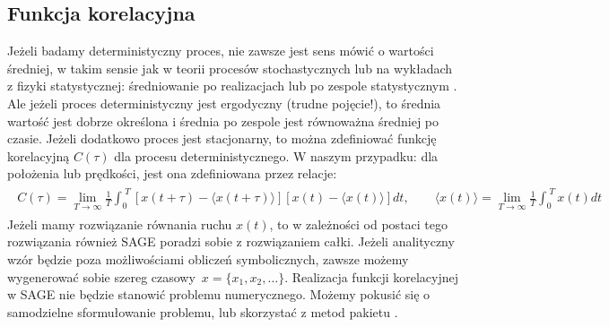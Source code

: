 \documentclass[a4paper,12pt,polish]{sphinxmanual}
\begin{document}
\subsection{Funkcja korelacyjna}
\label{ch2/chII012:funkcja-korelacyjna}
Jeżeli badamy deterministyczny proces, nie zawsze jest sens mówić o wartości średniej,  w takim sensie jak w teorii procesów stochastycznych lub na wykładach z fizyki statystycznej: średniowanie po realizacjach lub po zespole statystycznym . Ale jeżeli proces deterministyczny jest ergodyczny (trudne pojęcie!), to średnia wartość jest dobrze określona i średnia po zespole  jest równoważna średniej po czasie.  Jeżeli dodatkowo  proces jest stacjonarny, to można zdefiniować funkcję korelacyjną $C(\tau)$  dla procesu deterministycznego. W naszym przypadku: dla położenia lub prędkości, jest ona zdefiniowana przez relacje:
\label{ch2/chII012:equation-eqn28}\begin{gather}
\begin{split}C(\tau) = \lim_{T\to \infty}   \frac{1}{T}   \int_0^{\; T}  [x(t+\tau) - \langle x(t+\tau)\rangle]  [ x(t) - \langle x(t)\rangle]  dt, \qquad \langle x(t)\rangle = \lim_{T\to \infty}   \frac{1}{T}   \int_0^{\; T}   x(t)  dt\end{split}\label{ch2/chII012-eqn28}
\end{gather}
Jeżeli mamy rozwiązanie równania ruchu $x(t)$, to w zależności od postaci tego rozwiązania również SAGE poradzi sobie z rozwiązaniem całki. Jeżeli analityczny wzór będzie poza możliwościami obliczeń symbolicznych, zawsze możemy wygenerować sobie szereg czasowy $x = \{x_1, x_2, \dots \}$. Realizacja funkcji korelacyjnej w SAGE nie będzie stanowić problemu numerycznego. Możemy pokusić się o samodzielne sformułowanie problemu, lub skorzystać z metod pakietu .
\end{document}
